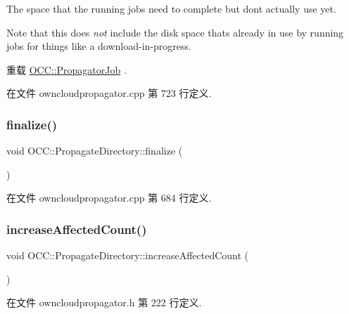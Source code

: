 The space that the running jobs need to complete but don\textquotesingle{}t actually use yet.

Note that this does {\itshape not} include the disk space that\textquotesingle{}s already in use by running jobs for things like a download-\/in-\/progress. 

重载 \hyperlink{class_o_c_c_1_1_propagator_job_a7bc39b8adaf93fd29668b768e1e7b20d}{O\+C\+C\+::\+Propagator\+Job} .



在文件 owncloudpropagator.\+cpp 第 723 行定义.

\mbox{\label{class_o_c_c_1_1_propagate_directory_a080c821f4a42533c9967385e6f01a4e9}} 
\subsubsection{\texorpdfstring{finalize()}{finalize()}}
{\footnotesize\ttfamily void O\+C\+C\+::\+Propagate\+Directory\+::finalize (\begin{DoxyParamCaption}{ }\end{DoxyParamCaption})}



在文件 owncloudpropagator.\+cpp 第 684 行定义.

\mbox{\label{class_o_c_c_1_1_propagate_directory_a08079de774903ef6a89a7df4c9b3cd44}} 
\subsubsection{\texorpdfstring{increase\+Affected\+Count()}{increaseAffectedCount()}}
{\footnotesize\ttfamily void O\+C\+C\+::\+Propagate\+Directory\+::increase\+Affected\+Count (\begin{DoxyParamCaption}{ }\end{DoxyParamCaption})}



在文件 owncloudpropagator.\+h 第 222 行定义.

